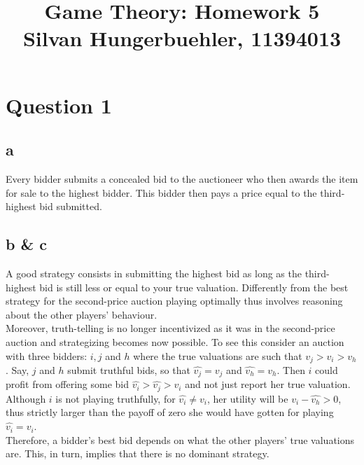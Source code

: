 \documentclass[10pt,a4paper]{article}
\title{%
  Game Theory: Homework 5 \\
  \large Silvan Hungerbuehler, 11394013}
\date{}
\begin{document}
\maketitle

\section*{Question 1}
\subsection*{a}
Every bidder submits a concealed bid to the auctioneer who then awards the item for sale to the highest bidder. This bidder then pays a price equal to the third-highest bid submitted.
\subsection*{b \& c}
A good strategy consists in submitting the highest bid as long as the third-highest bid is still less or equal to your true valuation. Differently from the best strategy for the second-price auction playing optimally thus involves reasoning about the other players' behaviour.\\
Moreover, truth-telling is no longer incentivized as it was in the second-price auction and strategizing becomes now possible. To see this consider an auction with three bidders: $i,j$ and $h$ where the true valuations are such that $v_j>v_i>v_h$. Say, $j$ and $h$ submit truthful bids, so that $\hat{v_j}=v_j$ and $\hat{v_h}=v_h$. Then $i$ could profit from offering some bid $\hat{v_i}>\hat{v_j}>v_i$ and not just report her true valuation. Although $i$ is not playing truthfully, for $\hat{v_i}\neq v_i$, her utility will be $v_i-\hat{v_h}>0$, thus strictly larger than the payoff of zero she would have gotten for playing $\hat{v_i}=v_i$.\\
Therefore, a bidder's best bid depends on what the other players' true valuations are. This, in turn, implies that there is no dominant strategy.
\end{document}
